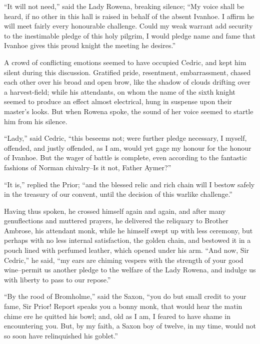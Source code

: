 ``It will not need,'' said the Lady Rowena, breaking silence; ``My voice
shall be heard, if no other in this hall is raised in behalf of the
absent Ivanhoe. I affirm he will meet fairly every honourable challenge.
Could my weak warrant add security to the inestimable pledge of this
holy pilgrim, I would pledge name and fame that Ivanhoe gives this proud
knight the meeting he desires.''

A crowd of conflicting emotions seemed to have occupied Cedric, and kept
him silent during this discussion. Gratified pride, resentment,
embarrassment, chased each other over his broad and open brow, like the
shadow of clouds drifting over a harvest-field; while his attendants, on
whom the name of the sixth knight seemed to produce an effect almost
electrical, hung in suspense upon their master's looks. But when Rowena
spoke, the sound of her voice seemed to startle him from his silence.

``Lady,'' said Cedric, ``this beseems not; were further pledge
necessary, I myself, offended, and justly offended, as I am, would yet
gage my honour for the honour of Ivanhoe. But the wager of battle is
complete, even according to the fantastic fashions of Norman
chivalry--Is it not, Father Aymer?''

``It is,'' replied the Prior; ``and the blessed relic and rich chain
will I bestow safely in the treasury of our convent, until the decision
of this warlike challenge.''

Having thus spoken, he crossed himself again and again, and after many
genuflections and muttered prayers, he delivered the reliquary to
Brother Ambrose, his attendant monk, while he himself swept up with less
ceremony, but perhaps with no less internal satisfaction, the golden
chain, and bestowed it in a pouch lined with perfumed leather, which
opened under his arm. ``And now, Sir Cedric,'' he said, ``my ears are
chiming vespers with the strength of your good wine--permit us another
pledge to the welfare of the Lady Rowena, and indulge us with liberty to
pass to our repose.''

``By the rood of Bromholme,'' said the Saxon, ``you do but small credit
to your fame, Sir Prior! Report speaks you a bonny monk, that would hear
the matin chime ere he quitted his bowl; and, old as I am, I feared to
have shame in encountering you. But, by my faith, a Saxon boy of twelve,
in my time, would not so soon have relinquished his goblet.''

